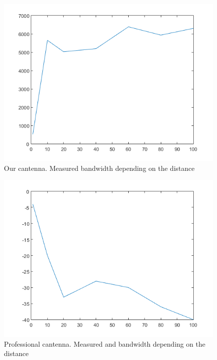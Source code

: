 \begin{figure}
	\includegraphics[width=\textwidth]{plots/can_b.png}
	\caption{Our cantenna. Measured bandwidth depending on the distance}
	\label{img:dist:band:can}
\end{figure}
\begin{figure}
	\includegraphics[width=\textwidth]{plots/prof_p.png}
	\caption{Professional cantenna. Measured and bandwidth depending on the distance}
	\label{img:dist:band:prof}
\end{figure}
